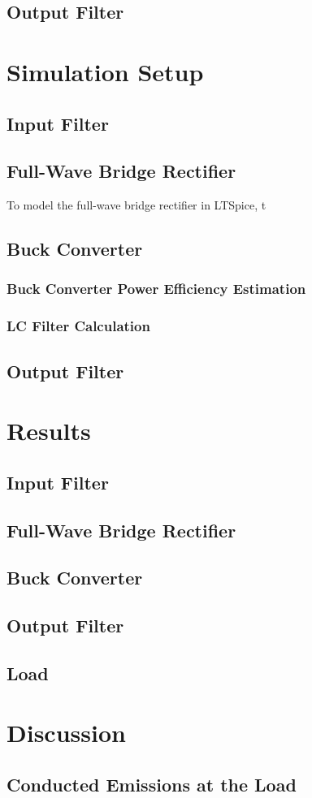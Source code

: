 \documentclass[conference]{IEEEtran}
\begin{document}
\subsection{Output Filter}

\section{Simulation Setup}
\subsection{Input Filter}
\subsection{Full-Wave Bridge Rectifier}
To model the full-wave bridge rectifier in LTSpice, t

\subsection{Buck Converter}
\subsubsection{Buck Converter Power Efficiency Estimation}
\subsubsection{LC Filter Calculation}
\subsection{Output Filter}


\section{Results}
\subsection{Input Filter}
\subsection{Full-Wave Bridge Rectifier}
\subsection{Buck Converter}
\subsection{Output Filter}
\subsection{Load}

\section{Discussion}
\subsection{Conducted Emissions at the Load}

\nocite{*}


\end{document}
